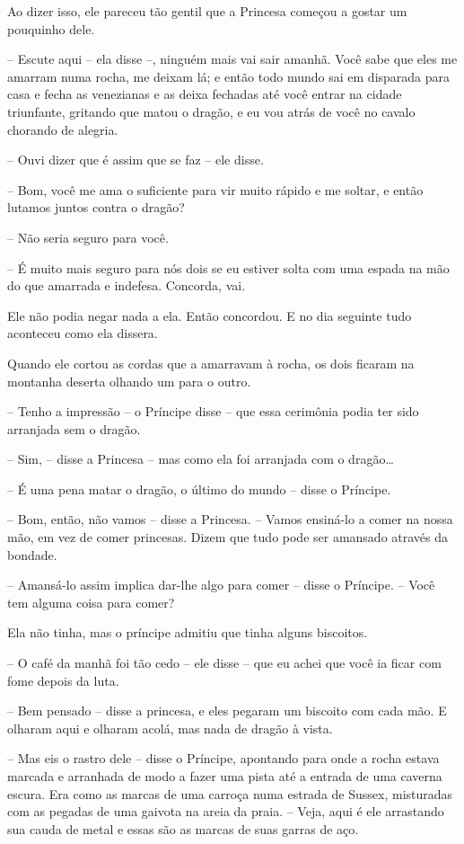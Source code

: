 Ao dizer isso, ele pareceu tão gentil que a Princesa começou a gostar
um pouquinho dele.

-- Escute aqui -- ela disse --, ninguém mais vai sair amanhã. Você sabe
que eles me amarram numa rocha, me deixam lá; e então todo mundo sai
em disparada para casa e fecha as venezianas e as deixa fechadas até
você entrar na cidade triunfante, gritando que matou o dragão, e eu
vou atrás de você no cavalo chorando de alegria.

-- Ouvi dizer que é assim que se faz -- ele disse.

-- Bom, você me ama o suficiente para vir muito rápido e me soltar, e
então lutamos juntos contra o dragão?

-- Não seria seguro para você.

-- É muito mais seguro para nós dois se eu estiver solta com uma espada
na mão do que amarrada e indefesa. Concorda, vai.

Ele não podia negar nada a ela. Então concordou. E no dia seguinte
tudo aconteceu como ela dissera. 

Quando ele cortou as cordas que a amarravam à rocha, os dois ficaram
na montanha deserta olhando um para o outro.

-- Tenho a impressão -- o Príncipe disse -- que essa cerimônia podia ter
sido arranjada sem o dragão.

-- Sim, -- disse a Princesa -- mas como ela foi arranjada com o dragão…

-- É uma pena matar o dragão, o último do mundo -- disse o Príncipe.

-- Bom, então, não vamos -- disse a Princesa. -- Vamos ensiná-lo a comer
na nossa mão, em vez de comer princesas. Dizem que tudo pode ser
amansado através da bondade.

-- Amansá-lo assim implica dar-lhe algo para comer -- disse o Príncipe.
-- Você tem alguma coisa para comer?

Ela não tinha, mas o príncipe admitiu que tinha alguns biscoitos. 

-- O café da manhã foi tão cedo -- ele disse -- que eu achei que você ia
ficar com fome depois da luta.

-- Bem pensado -- disse a princesa, e eles pegaram um biscoito com cada
mão. E olharam aqui e olharam acolá, mas nada de dragão à vista.

-- Mas eis o rastro dele -- disse o Príncipe, apontando para onde a
rocha estava marcada e arranhada de modo a fazer uma pista até a
entrada de uma caverna escura. Era como as marcas de uma carroça numa
estrada de Sussex, misturadas com as pegadas de uma gaivota na areia
da praia. -- Veja, aqui é ele arrastando sua cauda de metal e essas
são as marcas de suas garras de aço.

